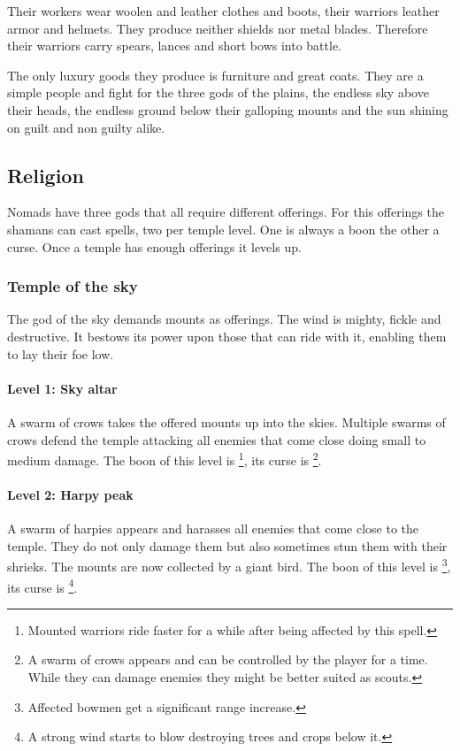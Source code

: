 \documentclass[a4paper]{book}
\begin{document}
	Their workers wear woolen and leather clothes and boots,
	their warriors leather armor and helmets.
	They produce neither shields nor metal blades.
	Therefore their warriors carry spears, lances and short bows into battle.

	The only luxury goods they produce is furniture and great coats.
	They are a simple people and fight for the three gods of the plains,
	the endless sky above their heads, the endless ground below their galloping
	mounts and the sun shining on guilt and non guilty alike.

	\subsection{Religion}
		\Gls{Nomads} have three gods that all require different offerings.
		For this offerings the shamans can cast spells, two per temple level.
		One is always a boon the other a curse.
		Once a temple has enough offerings it levels up.

		\subsubsection{Temple of the sky}
			The god of the sky demands mounts as offerings.
			The wind is mighty, fickle and destructive.
			It bestows its power upon those that can ride with it,
			enabling them to lay their foe low.

			\paragraph{Level 1: Sky altar}
				A swarm of crows takes the offered mounts up into the skies.
				Multiple swarms of crows defend the temple attacking all enemies that come
				close doing small to medium damage.
				The boon of this level is \footnote{
					Mounted warriors ride faster for a while after being affected
					by this spell.
				},
				its curse is \footnote{
					A swarm of crows appears and can be controlled by the player for a time.
					While they can damage enemies they might be better suited as scouts.
				}.

			\paragraph{Level 2: Harpy peak}
				A swarm of harpies appears and harasses all enemies that come close to the temple.
				They do not only damage them but also sometimes stun them with their shrieks.
				The mounts are now collected by a giant bird.
				The boon of this level is \footnote{
					Affected bowmen get a significant range increase.
				},
				its curse is \footnote{
					A strong wind starts to blow destroying trees and crops below it.
				}.
\end{document}
